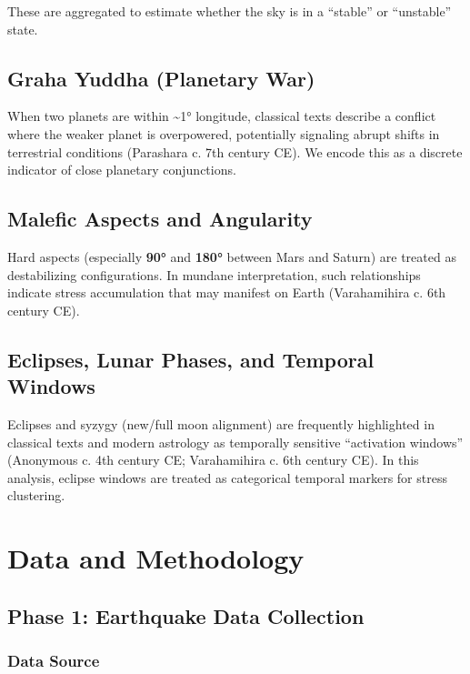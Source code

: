 \documentclass[
  11pt,
  a4paper,
  oneside,
  openany]{article}
\begin{document}
These are aggregated to estimate whether the sky is in a ``stable'' or
``unstable'' state.

\subsection{Graha Yuddha (Planetary
War)}\label{graha-yuddha-planetary-war}

When two planets are within \textasciitilde1° longitude, classical texts
describe a conflict where the weaker planet is overpowered, potentially
signaling abrupt shifts in terrestrial conditions (Parashara c. 7th
century CE). We encode this as a discrete indicator of close planetary
conjunctions.

\subsection{Malefic Aspects and
Angularity}\label{malefic-aspects-and-angularity}

Hard aspects (especially \textbf{90°} and \textbf{180°} between Mars and
Saturn) are treated as destabilizing configurations. In mundane
interpretation, such relationships indicate stress accumulation that may
manifest on Earth (Varahamihira c. 6th century CE).

\subsection{Eclipses, Lunar Phases, and Temporal
Windows}\label{eclipses-lunar-phases-and-temporal-windows}

Eclipses and syzygy (new/full moon alignment) are frequently highlighted
in classical texts and modern astrology as temporally sensitive
``activation windows'' (Anonymous c. 4th century CE; Varahamihira c. 6th
century CE). In this analysis, eclipse windows are treated as
categorical temporal markers for stress clustering.

\section{Data and Methodology}\label{data-and-methodology}

\subsection{Phase 1: Earthquake Data
Collection}\label{phase-1-earthquake-data-collection}

\subsubsection{Data Source}\label{data-source}
\end{document}
